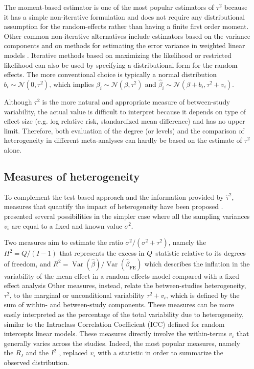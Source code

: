 \documentclass[11pt,a4paper,twoside,openany]{book}\usepackage{knitr}
\DeclareMathOperator{\Var}{Var}
\begin{document}
{\noindent The moment-based estimator is one of the most popular estimators of $\tau^2$ because it has a simple non-iterative formulation and does not require any distributional assumption for the random-effects rather than having a finite first order moment. Other common non-iterative alternatives include estimators based on the variance components \citep{hedges1983random} and on methods for estimating the error variance in weighted linear models \citep{sidik2005simple}. Iterative methods based on maximizing the likelihood or restricted likelihood can also be used by specifying a distributional form for the random-effects. The more conventional choice is typically a normal distribution $b_i \sim \mathcal{N}\left( 0, \tau^2 \right)$, which implies $\beta_i \sim \mathcal{N}\left(\beta, \tau^2 \right)$ and $\hat \beta_i \sim \mathcal{N}\left(\beta + b_i, \tau^2 + v_i \right)$.

Although $\tau^2$ is the more natural and appropriate measure of between-study variability, the actual value is difficult to interpret because it depends on type of effect size (e.g. log relative risk, standardized mean difference) and has no upper limit. Therefore, both evaluation of the degree (or levels) and the comparison of heterogeneity in different meta-analyses can hardly be based on the estimate of $\tau^2$ alone.


\subsection{Measures of heterogeneity}\label{sec:measures_het}

To complement the test based approach and the information provided by $\hat \tau^2$, measures that quantify the impact of heterogeneity have been proposed \citep{higgins2002quantifying}. 
\cite{higgins2002quantifying} presented several possibilities in the simpler case where all the sampling variances $v_i$ are equal to a fixed and known value $\sigma^2$. 

\noindent Two measures aim to estimate the ratio $\sigma^2/(\sigma^2 + \tau^2)$, namely the $H^2= Q/(I-1)$ that represents the excess in $Q$~statistic relative to its degrees of freedom, and $R^2 = \Var\left(\hat \beta\right)/\Var\left(\hat \beta_{\text{FE}}\right)$ which describes the inflation in the variability of the mean effect in a random-effects model compared with a fixed-effect analysis
Other measures, instead, relate the between-studies heterogeneity, $\tau^2$, to the marginal or unconditional variability $\tau^2 + v_i$, which is defined by the sum of within- and between-study components. These measures can be more easily interpreted as the percentage of the total variability due to heterogeneity, similar to the Intraclass Correlation Coefficient (ICC) defined for random intercepts linear models. These measures directly involve the within-terms $v_i$ that generally varies across the studies. Indeed, the most popular measures, namely the $R_I$ \citep{takkouche1999evaluation} and the $I^2$ \citep{higgins2002quantifying}, replaced $v_i$ with a statistic in order to summarize the observed distribution.

}
\end{document}
